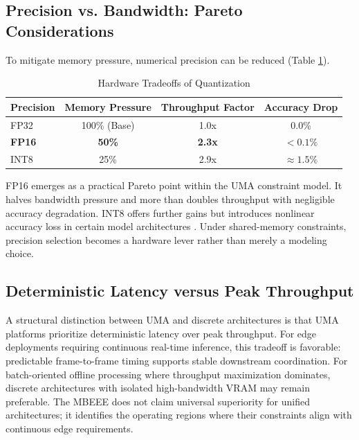 \documentclass[conference]{IEEEtran}
\begin{document}
\subsection{Precision vs. Bandwidth: Pareto Considerations}
To mitigate memory pressure, numerical precision can be reduced (Table \ref{tab:quantization}).

\begin{table}[htbp]
\caption{Hardware Tradeoffs of Quantization}
\begin{center}
\begin{tabular}{lccc}
\toprule
\textbf{Precision} & \textbf{Memory Pressure} & \textbf{Throughput Factor} & \textbf{Accuracy Drop} \\
\midrule
FP32 & 100\% (Base) & 1.0x & 0.0\% \\
\textbf{FP16} & \textbf{50\%} & \textbf{2.3x} & \textbf{$<0.1\%$} \\
INT8 & 25\% & 2.9x & $\approx 1.5\%$ \\
\bottomrule
\end{tabular}
\end{center}
\label{tab:quantization}
\end{table}

FP16 emerges as a practical Pareto point within the UMA constraint model. It halves bandwidth pressure and more than doubles throughput with negligible accuracy degradation. INT8 offers further gains but introduces nonlinear accuracy loss in certain model architectures \cite{b37, b38}. Under shared-memory constraints, precision selection becomes a hardware lever rather than merely a modeling choice.

\subsection{Deterministic Latency versus Peak Throughput}
A structural distinction between UMA and discrete architectures is that UMA platforms prioritize deterministic latency over peak throughput. For edge deployments requiring continuous real-time inference, this tradeoff is favorable: predictable frame-to-frame timing supports stable downstream coordination. For batch-oriented offline processing where throughput maximization dominates, discrete architectures with isolated high-bandwidth VRAM may remain preferable. The MBEEE does not claim universal superiority for unified architectures; it identifies the operating regions where their constraints align with continuous edge requirements.
\end{document}
